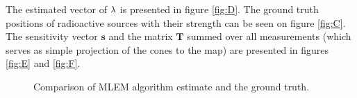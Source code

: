 The estimated vector of $\bf{\lambda}$ is presented in figure \ref{fig:D}. 
The ground truth positions of radioactive sources with their strength can be seen on figure \ref{fig:C}.
The sensitivity vector $\mathbf{s}$ and the matrix $\mathbf{T}$ summed over all measurements (which serves as simple projection of the cones to the map) are presented in figures \ref{fig:E} and \ref{fig:F}.
\begin{figure}[!h]
  \centering
  \label{fig:A}
  \caption{Comparison of MLEM algorithm estimate and the ground truth.}
\end{figure}

